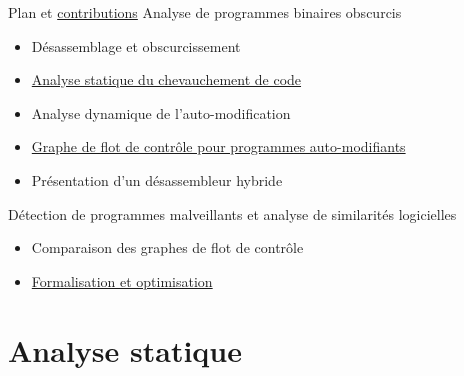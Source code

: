 \documentclass{beamer}
\begin{document}
\begin{frame}{Plan et \underline{contributions}}
Analyse de programmes binaires obscurcis
\begin{itemize}
 \item Désassemblage et obscurcissement
 \item \underline{Analyse statique du chevauchement de code}
 \item Analyse dynamique de l'auto-modification
 \item \underline{Graphe de flot de contrôle pour programmes auto-modifiants}
 \item Présentation d'un désassembleur hybride
\end{itemize}

Détection de programmes malveillants et analyse de similarités logicielles
\begin{itemize}
 \item Comparaison des graphes de flot de contrôle
 \item \underline{Formalisation et optimisation}
\end{itemize}

\end{frame}

\section{Analyse statique}
\end{document}
